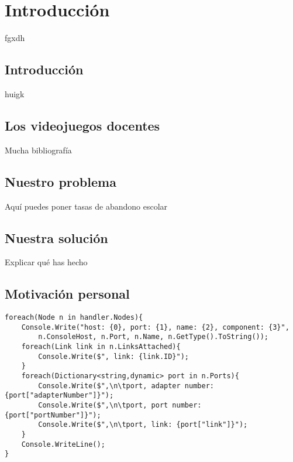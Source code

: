 \chapter{Introducción}\label{chap:Intro}

fgxdh

\section{Introducción}

huigk

\section{Los videojuegos docentes}

Mucha bibliografía

\section{Nuestro problema}

Aquí puedes poner tasas de abandono escolar

\section{Nuestra solución}

Explicar qué has hecho

\section{Motivación personal}

\begin{lstlisting}[style=CodigoCs]
foreach(Node n in handler.Nodes){
	Console.Write("host: {0}, port: {1}, name: {2}, component: {3}",
		n.ConsoleHost, n.Port, n.Name, n.GetType().ToString());
	foreach(Link link in n.LinksAttached){
		Console.Write($", link: {link.ID}");
	}
	foreach(Dictionary<string,dynamic> port in n.Ports){
		Console.Write($",\n\tport, adapter number: {port["adapterNumber"]}");
		Console.Write($",\n\tport, port number: {port["portNumber"]}");
		Console.Write($",\n\tport, link: {port["link"]}");
	}
	Console.WriteLine();
}
\end{lstlisting}


